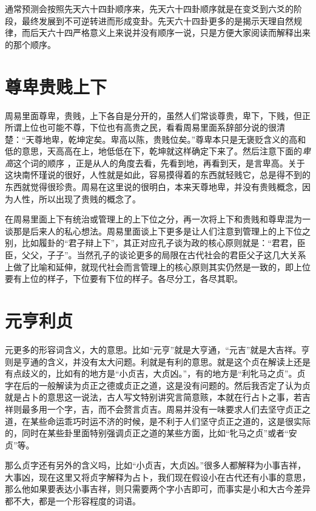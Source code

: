 \documentclass[12pt,oneside]{book}
\begin{document}
通常预测会按照先天六十四卦顺序来，先天六十四卦顺序就是在变爻到六爻的阶段，最终发展到不可逆转进而形成变卦。先天六十四卦更多的是揭示天理自然规律，而后天六十四严格意义上来说并没有顺序一说，只是方便大家阅读而解释出来的那个顺序。

\section{尊卑贵贱上下}
周易里面尊卑，贵贱，上下各自是分开的，虽然人们常谈尊贵，卑下，下贱，但正所谓上位也可能不尊，下位也有高贵之民，看看周易里面系辞部分说的很清楚：“天尊地卑，乾坤定矣。卑高以陈，贵贱位矣。”尊卑本只是无褒贬含义的高和低的意思，天高高在上，地低低在下，乾坤就这样确定下来了。然后注意下面的\emph{卑高}这个词的顺序 ，正是从人的角度去看，先看到地，再看到天，是言卑高。关于这块南怀瑾说的很好，人性就是如此，容易摸得着的东西就轻贱它，总是得不到的东西就觉得很珍贵。周易在这里说的很明白，本来天尊地卑，并没有贵贱概念，因为人性，所以出现了贵贱的概念了。

在周易里面上下有统治或管理上的上下位之分，再一次将上下和贵贱和尊卑混为一谈那是后来人的私心想法。周易里面谈上下更多是让人们注意到管理上的上下位之别，比如履卦的“君子辩上下”，其正对应孔子谈为政的核心原则就是：“君君，臣臣，父父，子子”。当然孔子的谈论更多的局限在古代社会的君臣父子这几大关系上做了比喻和延伸，就现代社会而言管理上的核心原则其实仍然是一致的，即上位要有上位的样子，下位要有下位的样子。各尽分工，各尽其职。

\section{元亨利贞}
元更多的形容词含义，大的意思。比如“元亨”就是大亨通，“元吉”就是大吉祥。亨则是亨通的含义，并没有太大问题。利就是有利的意思。就是这个贞在解读上还是有点歧义的，比如有的地方是“小贞吉，大贞凶。”，有的地方是“利牝马之贞”。贞字在后的一般解读为贞正之德或贞正之道，这是没有问题的。然后我否定了认为贞就是占卜的意思这一说法，古人写文特别讲究言简意赅，本就在行占卜之事，若吉祥则最多用一个字，吉，而不会赘言贞吉。周易并没有一味要求人们去坚守贞正之道，在某些命运乖巧时运不济的时候，是不利于人们坚守贞正之道的，这是很实际的，同时在某些卦里面特别强调贞正之道的某些方面，比如“牝马之贞”或者“安贞”等。

那么贞字还有另外的含义吗，比如“小贞吉，大贞凶。”很多人都解释为小事吉祥，大事凶，现在这里又将贞字解释为占卜，我们现在假设小在古代还有小事的意思，那么他如果要表达小事吉祥，则只需要两个字小吉即可，而事实是小和大古今差异都不大，都是一个形容程度的词语。
\end{document}
